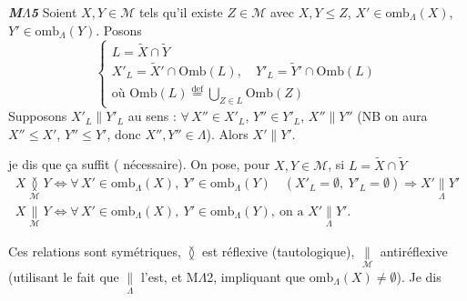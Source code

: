 \documentclass[11pt,a4paper]{article}
\begin{document}
\textbf{\emph{M$\Lambda$5}} Soient $X, Y \in \mathcal{M}$ tels qu'il existe $Z \in \mathcal{M}$ avec $X, Y \leq Z$,  $X' \in \mathrm{omb}_{\Lambda}(X)$, $Y' \in \mathrm{omb}_{\Lambda}(Y)$. Posons
\[
  \begin{cases}
    L = \widetilde{X} \cap \widetilde{Y} \\
    X'_L = \widetilde{X}' \cap \mathrm{Omb}(L) , \quad Y'_L = \widetilde{Y}' \cap \mathrm{Omb}(L) \\
    \text{où } \mathrm{Omb}(L) \overset{\mathrm{def}}{=} \bigcup_{Z \in L} \mathrm{Omb}(Z)
  \end{cases}
\]
Supposons $X'_L \parallel Y'_L$ au sens : $\forall\, X'' \in X'_L$, $Y'' \in Y'_L$,  $X'' \parallel Y''$ (NB on aura $X'' \leq X'$, $Y'' \leq Y'$, donc $X'', Y'' \in \Lambda$). Alors $X' \parallel Y'$.

  je dis que ça suffit (  \ill{} nécessaire). \struck{\ill{} \ill{}} On pose, pour $X, Y \in \mathcal{M}$, si $L = \widetilde{X} \cap \widetilde{Y}$
\[
  \begin{array}{l}
    X \underset{\mathcal{M}}{\between} Y \iff \forall\, X' \in \mathrm{omb}_{\Lambda}(X),\ Y' \in \mathrm{omb}_{\Lambda}(Y) \quad (X'_L = \emptyset,\ Y'_L = \emptyset) \Longrightarrow X' \underset{\Lambda}{\parallel} Y' \\
    X \underset{\mathcal{M}}{\parallel} Y \iff \forall\, X' \in \mathrm{omb}_{\Lambda}(X),\ Y' \in \mathrm{omb}_{\Lambda}(Y) ,\ \text{on a } X' \underset{\Lambda}{\parallel} Y' .
  \end{array}
\]

Ces relations sont symétriques, $\between$ est réflexive (tautologique), $\underset{\mathcal{M}}{\parallel}$ antiréflexive (utilisant le fait que $\underset{\Lambda}{\parallel}$ l'est, et M$\Lambda$2, impliquant que $\mathrm{omb}_{\Lambda}(X) \neq \emptyset$). Je dis
\end{document}
